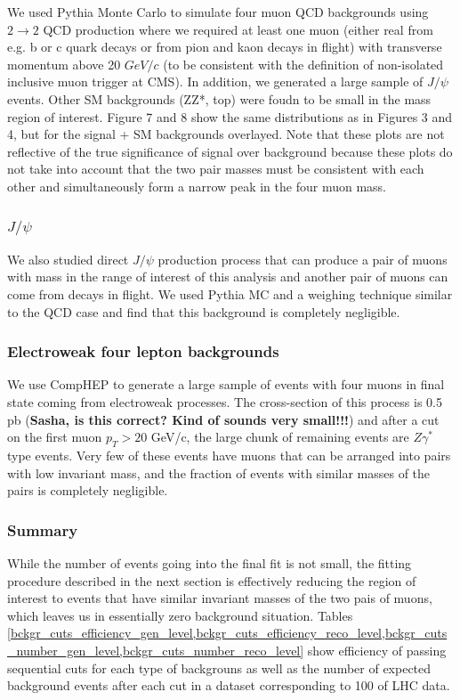 \documentclass[aps,prd,onecolumn,superscriptaddress,showpacs]{revtex4}
\begin{document}
We used Pythia Monte Carlo to simulate four muon QCD backgrounds using $2 \to 2$ 
QCD production where we required at least one muon (either real from e.g. b or c
quark decays or from pion and kaon decays in flight) with transverse 
momentum above 20 $GeV/c$ (to be consistent with the definition of
non-isolated inclusive muon trigger at CMS). In addition, we generated a large 
sample of $J/\psi$ events. Other SM backgrounds (ZZ*, top) were foudn to be 
small in the mass region of interest. Figure 7 and 8 show the same distributions
as in Figures 3 and 4, but for the signal + SM backgrounds overlayed. Note that 
these plots are not reflective of the true significance of signal over background 
because these plots do not take into account that the two pair masses must be 
consistent with each other and simultaneously form a narrow peak in the four muon 
mass.

\subsubsection{$J/\psi$}

We also studied direct $J/\psi$ production process that can produce a pair of muons with mass in
the range of interest of this analysis and another pair of muons can come from decays in flight. We
used Pythia MC and a weighing technique similar to the QCD case and find that this background is
completely negligible.

\subsubsection{Electroweak four lepton backgrounds}

We use CompHEP to generate a large sample of events with four muons in final state coming from electroweak 
processes. The cross-section of this process is 0.5 pb ({\bf Sasha, is this correct? Kind of sounds very 
small!!!}) and after a cut on the first muon $p_T>20$ GeV/c, the large chunk of remaining events are 
$Z\gamma^*$ type events. Very few of these events have muons that can be arranged into pairs with low invariant 
mass, and the fraction of events with similar masses of the pairs is completely negligible.

\subsubsection{Summary}
While the number of events going into the final fit is not small, the fitting procedure described in the next
section is effectively reducing the region of interest to events that have similar invariant masses of the 
two pais of muons, which leaves us in essentially zero background situation. Tables \ref{bckgr_cuts_efficiency_gen_level,bckgr_cuts_efficiency_reco_level,bckgr_cuts_number_gen_level,bckgr_cuts_number_reco_level}
show efficiency of passing
sequential cuts for each type of backgrouns as well as the number of expected background events after each cut in a 
dataset corresponding to 100 \ipb of LHC data.
\end{document}
